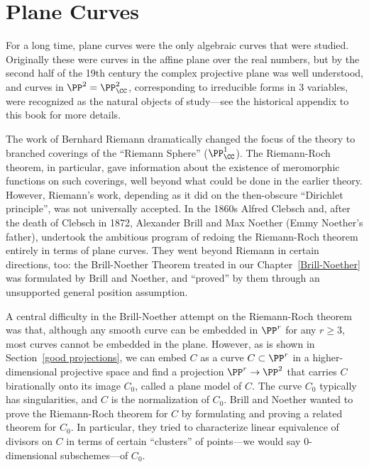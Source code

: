 

\def\adj{{\mathfrak F}}
\chapter{Plane Curves}
\label{PlaneCurvesChapter}


For a long time, plane curves were the only algebraic curves that were studied. Originally these were curves in the affine plane over the real numbers, but by the second half of the 19th century the complex projective plane was well understood, and curves in $\PP^2 = \PP^2_\CC$, corresponding to irreducible forms in 3 variables, were recognized as the natural objects of study---see the historical appendix to this book for more details.

The work of Bernhard Riemann dramatically changed the focus of the theory to branched coverings of   the ``Riemann Sphere'' ($\PP^1_\CC$). The Riemann-Roch theorem, in particular, gave information about the existence of meromorphic functions on such coverings, well beyond what could be done in the earlier theory. However, Riemann's work, depending as it did on the then-obscure ``Dirichlet principle'', was not universally accepted. In the 1860s Alfred Clebsch and, after the death of Clebsch  in 1872, Alexander Brill and Max Noether (Emmy Noether's father), undertook the ambitious program of redoing the Riemann-Roch theorem entirely in terms of plane curves. They went beyond Riemann in certain directions, too: the Brill-Noether Theorem treated in our Chapter~\ref{Brill-Noether} was formulated by Brill and Noether, and ``proved'' by them through an unsupported general position assumption. 


A central difficulty in the Brill-Noether attempt on the Riemann-Roch theorem was that,
although any smooth curve can be embedded in $\PP^r$ for any $r \geq 3$, most curves cannot be embedded in the plane. 
However, as is shown in Section~\ref{good projections}, we can embed $C$ as a curve $ C \subset \PP^r$ in a higher-dimensional projective space and find a projection $\PP^r \to \PP^2$ that carries $C$ birationally onto its image $C_0$, called a plane model of $C$. The curve $C_0$ typically has singularities, and $C$ is the normalization of $C_0$. Brill and Noether wanted to prove the Riemann-Roch theorem for $C$ by formulating and proving a related theorem for $C_0$. In particular, they tried to characterize linear equivalence of divisors on $C$ in terms of certain ``clusters'' of points---we would say 0-dimensional subschemes---of $C_0$. 

